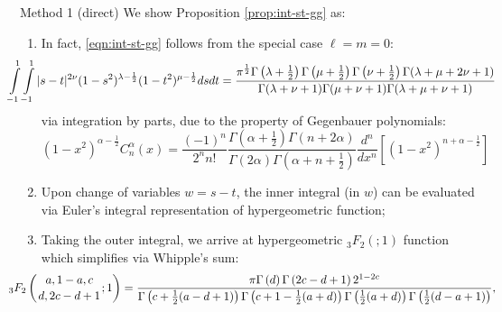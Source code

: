 \documentclass[pdf,notes]{beamer}
\begin{document}
\begin{frame}{Method 1 (direct)}
	\scriptsize
	We show Proposition \ref{prop:int-st-gg} as:
	\begin{enumerate}
		\item In fact, \eqref{eqn:int-st-gg} follows from the special case $\ell=m=0$:
			\begin{equation*}
				\kern-1cm\int_{- 1}^1 \int_{- 1}^1 | s - t |^{2 \nu} (1 - s^2)^{\lambda - \frac{1}{2}}
				(1 - t^2)^{\mu - \frac{1}{2}} d s d t = \frac{\pi^{\frac{1}{2}} \Gamma \left(
				\lambda + \frac{1}{2} \right) \Gamma \left( \mu + \frac{1}{2} \right) \Gamma
				\left( \nu + \frac{1}{2} \right) \Gamma (\lambda + \mu + 2 \nu + 1)}{\Gamma
				(\lambda + \nu + 1) \Gamma (\mu + \nu + 1) \Gamma (\lambda + \mu + \nu + 1)}
			\end{equation*}
			via integration by parts, due to the property of Gegenbauer polynomials:\begin{equation*}
				(1-x^2)^{\alpha-\frac{1}{2}}C_n^\alpha(x)=\frac{(-1)^n}{2^nn!}\frac{\Gamma\left( \alpha+\frac{1}{2} \right)\Gamma\left( n+2\alpha \right)}{\Gamma(2\alpha)\Gamma\left(\alpha+n+\frac{1}{2}  \right)}
				\frac{d^n}{dx^n}\left[ (1-x^2)^{n+\alpha-\frac{1}{2}} \right]
			\end{equation*}
		\item Upon change of variables $w=s-t$, the inner integral (in $w$) can be evaluated via Euler's integral representation of hypergeometric function;
	\item Taking the outer integral, we arrive at hypergeometric $_3F_2(;1)$ function which simplifies via Whipple's sum:\begin{equation*}
		\kern-1cm{}_{3}F_{2}\left({a,1-a,c\atop d,2c-d+1};1\right)=\frac{\pi\Gamma\left(d%
				\right)\Gamma\left(2c-d+1\right)2^{1-2c}}{\Gamma\left(c+\frac{1}{2}(a-d+1)%
				\right)\Gamma\left(c+1-\frac{1}{2}(a+d)\right)\Gamma\left(\frac{1}{2}(a+d)%
			\right)\Gamma\left(\frac{1}{2}(d-a+1)\right)},
		\end{equation*}
	\end{enumerate}
\end{frame}
\end{document}
